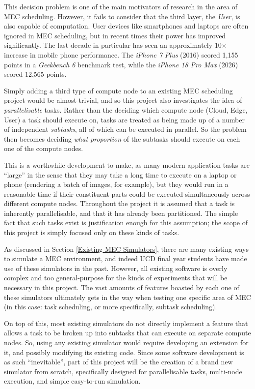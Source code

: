 \documentclass[]{UCD_CS_Interim_Report}
\begin{document}
This decision problem is one of the main motivators of research in the area of MEC scheduling. However, it fails to consider that the third layer, the \textit{User}, is also capable of computation. User devices like smartphones and laptops are often ignored in MEC scheduling, but in recent times their power has improved significantly. The last decade in particular has seen an approximately 10$\times$ increase in mobile phone performance. The \textit{iPhone 7 Plus} (2016) scored 1,155 points in a \textit{Geekbench 6} benchmark test, while the \textit{iPhone 18 Pro Max} (2026) scored 12,565 points. \cite{EveryMacBenchmarks}

Simply adding a third type of compute node to an existing MEC scheduling project would be almost trivial, and so this project also investigates the idea of \textit{parallelisable} tasks. Rather than the deciding which compute node (Cloud, Edge, User) a task should execute on, tasks are treated as being made up of a number of independent \textit{subtasks}, all of which can be executed in parallel. So the problem then becomes deciding \textit{what proportion} of the subtasks should execute on each one of the compute nodes.

This is a worthwhile development to make, as many modern application tasks are \enquote{large} in the sense that they may take a long time to execute on a laptop or phone (rendering a batch of images, for example), but they would run in a reasonable time if their constituent parts could be executed simultaneously across different compute nodes. Throughout the project it is assumed that a task is inherently parallelisable, and that it has already been partitioned. The simple fact that such tasks exist is justification enough for this assumption; the scope of this project is simply focused only on these kinds of tasks.

As discussed in Section \ref{Existing MEC Simulators}, there are many existing ways to simulate a MEC environment, and indeed UCD final year students have made use of these simulators in the past. However, all existing software is overly complex and too general-purpose for the kinds of experiments that will be necessary in this project. The vast amounts of features boasted by each one of these simulators ultimately gets in the way when testing one specific area of MEC (in this case: task scheduling, or more specifically, subtask scheduling).

On top of this, most existing simulators do not directly implement a feature that allows a task to be broken up into subtasks that can execute on separate compute nodes. So, using any existing simulator would require developing an extension for it, and possibly modifying its existing code. Since some software development is as such \enquote{inevitable}, part of this project will be the creation of a brand new simulator from scratch, specifically designed for parallelisable tasks, multi-node execution, and simple easy-to-run simulation.
\end{document}
